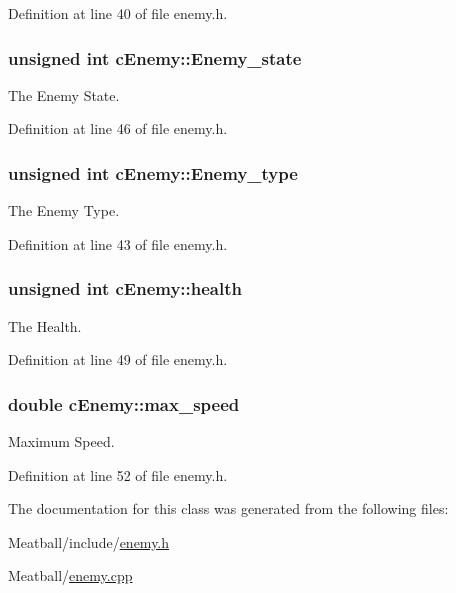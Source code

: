 Definition at line 40 of file enemy.\-h.

\hypertarget{classc_enemy_a858dd95ac9758be01aaa820745339c50}{
\subsubsection[{Enemy\-\_\-state}]{\setlength{\rightskip}{0pt plus 5cm}unsigned int c\-Enemy\-::\-Enemy\-\_\-state}}\label{classc_enemy_a858dd95ac9758be01aaa820745339c50}


The Enemy State. 



Definition at line 46 of file enemy.\-h.

\hypertarget{classc_enemy_a880c1a91dbfe21b21d42dfb4facfd8bd}{
\subsubsection[{Enemy\-\_\-type}]{\setlength{\rightskip}{0pt plus 5cm}unsigned int c\-Enemy\-::\-Enemy\-\_\-type}}\label{classc_enemy_a880c1a91dbfe21b21d42dfb4facfd8bd}


The Enemy Type. 



Definition at line 43 of file enemy.\-h.

\hypertarget{classc_enemy_a7f8cefdb27237e5639bda5136b8cb12f}{
\subsubsection[{health}]{\setlength{\rightskip}{0pt plus 5cm}unsigned int c\-Enemy\-::health}}\label{classc_enemy_a7f8cefdb27237e5639bda5136b8cb12f}


The Health. 



Definition at line 49 of file enemy.\-h.

\hypertarget{classc_enemy_a6e2b748e908bbd46d502a1c829c8201b}{
\subsubsection[{max\-\_\-speed}]{\setlength{\rightskip}{0pt plus 5cm}double c\-Enemy\-::max\-\_\-speed}}\label{classc_enemy_a6e2b748e908bbd46d502a1c829c8201b}


Maximum Speed. 



Definition at line 52 of file enemy.\-h.



The documentation for this class was generated from the following files\-:\begin{DoxyCompactItemize}
\item 
Meatball/include/\hyperlink{enemy_8h}{enemy.\-h}\item 
Meatball/\hyperlink{enemy_8cpp}{enemy.\-cpp}\end{DoxyCompactItemize}
